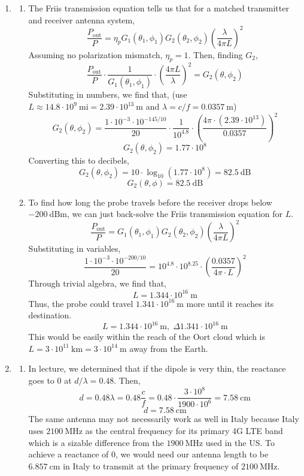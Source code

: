 \documentclass[12pt]{article}
\begin{document}
\begin{enumerate}
\begin{enumerate}
	\end{enumerate}

	\item [10.3]
	\begin{enumerate}
		\item [(a)]
		The Friis transmission equation tells us that for a matched transmitter and receiver antenna system,
		\[\frac{P_{\mathrm{out}}}{P}=\eta_pG_1(\theta_1,\phi_1)G_2(\theta_2,\phi_2)\left(\frac{\lambda}{4\pi L}\right)^2\]
		Assuming no polarization mismatch, $\eta_p=1$.
		Then, finding $G_2$,
		\[\frac{P_{\mathrm{out}}}{P}\cdot \frac{1}{G_1(\theta_1,\phi_1)}\cdot \left(\frac{4\pi L}{\lambda}\right)^2=G_2(\theta,\phi_2)\]
		Substituting in numbers, we find that, (use $L\approx 14.8\cdot 10^9\:\mathrm{mi}=2.39\cdot 10^{13}\:\mathrm{m}$ and $\lambda =c/f = 0.0357\:\mathrm{m}$)
		\[G_2(\theta,\phi_2)=\frac{1\cdot 10^{-3}\cdot 10^{-145/10}}{20}\cdot \frac{1}{10^{4.8}}\cdot\left(\frac{4\pi \cdot (2.39\cdot 10^{13})}{0.0357}\right)^2\]
		\[G_2(\theta,\phi_2)=1.77\cdot 10^8\]
		Converting this to decibels,
		\[G_2(\theta,\phi_2)=10\cdot \log_{10}\left(1.77\cdot 10^8\right)=82.5 \: \mathrm{dB}\]
		\[\boxed{G_2(\theta,\phi)=82.5\:\mathrm{dB}}\]

		\item [(b)]
		To find how long the probe travels before the receiver drops below $-200\:\mathrm{dBm}$, we can just back-solve the Friis transmission equation for $L$.
		\[\frac{P_{\mathrm{out}}}{P}=G_1(\theta_1,\phi_1)G_2(\theta_2,\phi_2)\left(\frac{\lambda}{4\pi L}\right)^2\]
		Substituting in variables,
		\[\frac{1\cdot 10^{-3}\cdot 10^{-200/10}}{20}=10^{4.8}\cdot 10^{8.25}\cdot \left(\frac{0.0357}{4\pi \cdot L}\right)^2\]
		Through trivial algebra, we find that,
		\[L=1.344 \cdot 10^{16}\:\mathrm{m}\]
		Thus, the probe could travel $1.341\cdot 10^{16}\:\mathrm{m}$ more until it reaches its destination.
		\[\boxed{L=1.344 \cdot 10^{16}\:\mathrm{m}, \; \Delta 1.341\cdot 10^{16}\:\mathrm{m}}\]
		This would be easily within the reach of the Oort cloud which is $L=3\cdot 10^{11}\:\mathrm{km}=3\cdot 10^{14}\:\mathrm{m}$ away from the Earth.


	\end{enumerate}

	\item [10.4]
	\begin{enumerate}
		\item [(a)]
		In lecture, we determined that if the dipole is very thin, the reactance goes to $0$ at $d/\lambda=0.48$.
		Then,
		\[d=0.48\lambda = 0.48\frac{c}{f}=0.48\cdot\frac{3\cdot 10^8}{1900 \cdot 10^6}=7.58\:\mathrm{cm}\]
		\[\boxed{d=7.58\:\mathrm{cm}}\]
		The same antenna may not necessarily work as well in Italy because Italy uses $2100\:\mathrm{MHz}$ as the central frequency for its primary 4G LTE band which is a sizable difference from the $1900\:\mathrm{MHz}$ used in the US.
		To achieve a reactance of $0$, we would need our antenna length to be $6.857\:\mathrm{cm}$ in Italy to transmit at the primary frequency of $2100\:\mathrm{MHz}$.


\end{enumerate}
\end{enumerate}
\end{document}
